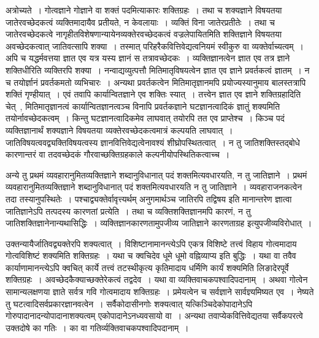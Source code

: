 			\begin{small}
				
				अत्रोच्यते~। गोत्वज्ञाने गोज्ञाने वा शक्तं पदमित्याकारः शक्तिग्रहः~। तथा च शक्यज्ञाने विषयतया जातेरवच्छेदकत्वं व्यक्तिमादायैव प्रतीयते, न केवलायाः~। व्यक्तिं विना जातेरप्रतीतेः~। तथा च जातेरवच्छेदकत्वे नागृहीतविशेषणान्यायेनव्यक्तेरवच्छेदकत्वं वज्रलेपायितमिति शक्तिज्ञाने विषयतया अवच्छेदकत्वात् जातिवत्सापि शक्या~। तस्मात् परिहरैकवित्तिवेद्यत्वनियमं स्वीकुरु वा व्यक्तेर्वाच्यत्वम्~। अपि च यद्धर्मवत्तया ज्ञात एव यत्र यस्य ज्ञानं स तत्रावच्छेदकः~। व्यक्तिज्ञानत्वेन ज्ञात एव तत्र ज्ञाने शक्तिधीरिति व्यक्तिरपि शक्या~। नन्वाद्यव्युत्पत्तौ मितिमातृविषयत्वेन ज्ञात एव ज्ञाने प्रवर्तकत्वं ज्ञातम्~। न च तयोर्ज्ञानं प्रवर्तकमतो व्यभिचारः~। अन्यथा प्रवर्तकत्वेन मितिमातृज्ञानमपि प्रयोज्यस्यानुमाय बालस्तत्रापि शक्तिं गृण्हीयात्~। एवं तवापि कार्यान्वितज्ञाने एव शक्तिः स्यात्~। तत्त्वेन ज्ञात एव ज्ञाने शक्तिग्रहादिति चेत्~, मितिमातृज्ञानत्वं कार्यान्वितज्ञानत्वञ्च विनापि प्रवर्तकज्ञाने घटज्ञानत्वादिकं ज्ञातुं शक्यमिति तयोर्नावच्छेदकत्वम्~। किन्तु घटज्ञानत्वादिकमेव लाघवात् तयोरपि तत एव प्राप्तेश्च~। किञ्च पदं व्यक्तिज्ञानार्थं शक्यज्ञाने विषयतया व्यक्तेरवच्छेदकत्वमात्रं कल्पयति लाघवात्~। जातिविषयत्ववद्व्यक्तिविषयत्वस्य ज्ञानवित्तिवेद्यत्वेनावश्यं शीघ्रोपस्थितत्वात्~। न तु जातिशक्तिस्तद्बोधे कारणान्तरं वा तदवच्छेदकं गौरवाच्छक्तिग्रहकाले कल्पनीयोपस्थितिकत्वाच्च~।
	
				अन्ये तु प्रथमं व्यवहारानुमितव्यक्तिज्ञाने शब्दानुविधानात् पदं शक्तमित्यवधारयति, न तु जातिज्ञाने~। प्रथमं व्यवहारानुमितव्यक्तिज्ञाने शब्दानुविधानात् पदं शक्तमित्यवधारयति न तु जातिज्ञाने~। व्यवहाराजनकत्वेन तदा तस्यानुपस्थितेः~। पश्चाद्व्यक्तेर्वावृत्त्यर्थम् अनुगमार्थञ्च जातिरपि तद्विषय इति मानान्तरेण ज्ञात्वा जातिज्ञानेऽपि तत्पदस्य कारणतां प्रत्येति~। तथा च व्यक्तिशक्तिज्ञानमपि कारणं, न तु जातिशक्तिज्ञानेनान्यथासिद्धिः~। व्यक्तिज्ञानकारणतामुपजीव्य जातिज्ञाने कारणताग्रह इत्युपजीव्यविरोधात्~। 

				उक्तन्यायैर्जातिवद्व्यक्तेरपि शक्यत्वात्~। विशिष्टानामानन्त्येऽपि एकत्र विशिष्टे तत्त्वं विहाय गोत्वमादाय गोत्वविशिष्टं शक्यमिति शक्तिग्रहः~। यथा च क्वचिदेव धूमे धूमो वह्निव्याप्य इति बुद्धिः~। यथा वा तवैव कार्याणामानन्त्येऽपि क्वचित् कार्ये तत्त्वं तटस्थीकृत्य कृतिमादाय धर्मिणि कार्यं शक्यमिति लिङादेरपूर्वे शक्तिग्रहः~। अवच्छेदकैक्याच्छक्तेरेकत्वं तद्वदेव~। यथा वा व्यक्तिवाचकपश्वादिपदानाम्~। अथवा गोत्वेन सामान्यलक्षणया ज्ञाते सर्वत्र गवि गोत्वमादाय शक्तिग्रहः~। प्रमेयत्वेन च सर्वज्ञाने सार्वज्ञ्यमिष्यत एव~। नेष्यते तु घटत्वादिसर्वप्रकारज्ञानवत्वेन~। सर्वैकोदासीनगोः शक्यत्वात् यत्किञ्चिदेकोपादानेऽपि गोरुपादानादन्योपादानाशक्यत्वम् एकोपादानेऽनध्यवसायो वा~। अन्यथा तवाप्येकवित्तिवेद्यतया सर्वैकपरत्वे उक्तदोषे का गतिः~। का वा गतिर्व्यक्तिवाचकपश्वादिपदानाम्~। 
			\end{small}



